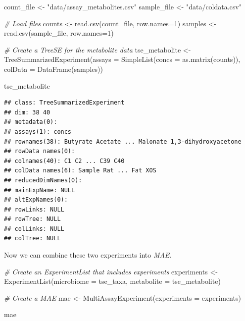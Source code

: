 \documentclass[
]{book}
\newenvironment{Shaded}{\begin{snugshade}}{\end{snugshade}}
\newcommand{\AttributeTok}[1]{\textcolor[rgb]{0.77,0.63,0.00}{#1}}
\newcommand{\CommentTok}[1]{\textcolor[rgb]{0.56,0.35,0.01}{\textit{#1}}}
\newcommand{\DecValTok}[1]{\textcolor[rgb]{0.00,0.00,0.81}{#1}}
\newcommand{\FunctionTok}[1]{\textcolor[rgb]{0.00,0.00,0.00}{#1}}
\newcommand{\NormalTok}[1]{#1}
\newcommand{\OtherTok}[1]{\textcolor[rgb]{0.56,0.35,0.01}{#1}}
\newcommand{\StringTok}[1]{\textcolor[rgb]{0.31,0.60,0.02}{#1}}
\begin{document}
\begin{Shaded}
\begin{Highlighting}[]
\NormalTok{count\_file }\OtherTok{\textless{}{-}} \StringTok{"data/assay\_metabolites.csv"}
\NormalTok{sample\_file }\OtherTok{\textless{}{-}} \StringTok{"data/coldata.csv"}

\CommentTok{\# Load files}
\NormalTok{counts  }\OtherTok{\textless{}{-}} \FunctionTok{read.csv}\NormalTok{(count\_file, }\AttributeTok{row.names=}\DecValTok{1}\NormalTok{)  }
\NormalTok{samples }\OtherTok{\textless{}{-}} \FunctionTok{read.csv}\NormalTok{(sample\_file, }\AttributeTok{row.names=}\DecValTok{1}\NormalTok{)}

\CommentTok{\# Create a TreeSE for the metabolite data}
\NormalTok{tse\_metabolite }\OtherTok{\textless{}{-}} \FunctionTok{TreeSummarizedExperiment}\NormalTok{(}\AttributeTok{assays =} \FunctionTok{SimpleList}\NormalTok{(}\AttributeTok{concs =} \FunctionTok{as.matrix}\NormalTok{(counts)),}
                                           \AttributeTok{colData =} \FunctionTok{DataFrame}\NormalTok{(samples))}

\NormalTok{tse\_metabolite}
\end{Highlighting}
\end{Shaded}

\begin{verbatim}
## class: TreeSummarizedExperiment 
## dim: 38 40 
## metadata(0):
## assays(1): concs
## rownames(38): Butyrate Acetate ... Malonate 1,3-dihydroxyacetone
## rowData names(0):
## colnames(40): C1 C2 ... C39 C40
## colData names(6): Sample Rat ... Fat XOS
## reducedDimNames(0):
## mainExpName: NULL
## altExpNames(0):
## rowLinks: NULL
## rowTree: NULL
## colLinks: NULL
## colTree: NULL
\end{verbatim}

Now we can combine these two experiments into \emph{MAE}.

\begin{Shaded}
\begin{Highlighting}[]
\CommentTok{\# Create an ExperimentList that includes experiments}
\NormalTok{experiments }\OtherTok{\textless{}{-}} \FunctionTok{ExperimentList}\NormalTok{(}\AttributeTok{microbiome =}\NormalTok{ tse\_taxa, }
                              \AttributeTok{metabolite =}\NormalTok{ tse\_metabolite)}

\CommentTok{\# Create a MAE}
\NormalTok{mae }\OtherTok{\textless{}{-}} \FunctionTok{MultiAssayExperiment}\NormalTok{(}\AttributeTok{experiments =}\NormalTok{ experiments)}

\NormalTok{mae}
\end{Highlighting}
\end{Shaded}
\end{document}
